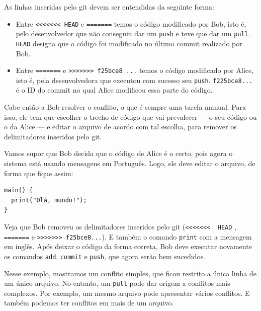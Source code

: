 \documentclass[
  11pt,
  twoside]{book}
\newcommand{\passthrough}[1]{#1}
\begin{document}
As linhas inseridas pelo git devem ser entendidas da seguinte forma:

\begin{itemize}
\item
  Entre \passthrough{\lstinline!<<<<<<< HEAD!} e
  \passthrough{\lstinline!=======!} temos o código modificado por Bob,
  isto é, pelo desenvolvedor que não conseguiu dar um
  \passthrough{\lstinline!push!} e teve que dar um
  \passthrough{\lstinline!pull!}. \passthrough{\lstinline!HEAD!} designa
  que o código foi modificado no último commit realizado por Bob.
\item
  Entre \passthrough{\lstinline!=======!} e
  \passthrough{\lstinline!>>>>>>> f25bce8 ...!} temos o código
  modificado por Alice, isto é, pela desenvolvedora que executou com
  sucesso seu \passthrough{\lstinline!push!}.
  \passthrough{\lstinline!f225bce8...!} é o ID do commit no qual Alice
  modificou essa parte do código.
\end{itemize}

Cabe então a Bob resolver o conflito, o que é sempre uma tarefa manual.
Para isso, ele tem que escolher o trecho de código que vai prevalecer
--- o seu código ou o da Alice --- e editar o arquivo de acordo com tal
escolha, para remover os delimitadores inseridos pelo git.

Vamos supor que Bob decida que o código de Alice é o certo, pois agora o
sistema está usando mensagens em Português. Logo, ele deve editar o
arquivo, de forma que fique assim:

\begin{lstlisting}
main() {                
  print("Olá, mundo!");                      
}                       
\end{lstlisting}

Veja que Bob removeu os delimitadores inseridos pelo git
(\passthrough{\lstinline!<<<<<<<  HEAD!} ,
\passthrough{\lstinline!=======!} e
\passthrough{\lstinline!>>>>>>> f25bce8...!}). E também o comando
\passthrough{\lstinline!print!} com a mensagem em inglês. Após deixar o
código da forma correta, Bob deve executar novamente os comandos
\passthrough{\lstinline!add!}, \passthrough{\lstinline!commit!} e
\passthrough{\lstinline!push!}, que agora serão bem sucedidos.

Nesse exemplo, mostramos um conflito simples, que ficou restrito a única
linha de um único arquivo. No entanto, um \passthrough{\lstinline!pull!}
pode dar origem a conflitos mais complexos. Por exemplo, um mesmo
arquivo pode apresentar vários conflitos. E também podemos ter conflitos
em mais de um arquivo.
\end{document}
